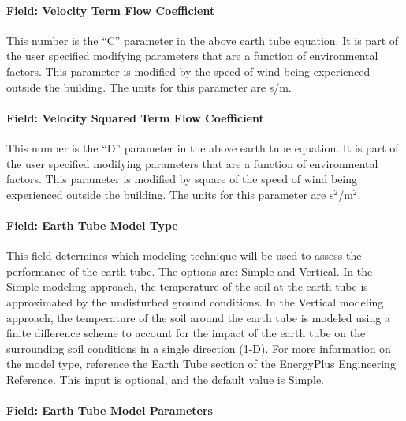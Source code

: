 \paragraph{Field: Velocity Term Flow Coefficient}\label{field-velocity-term-flow-coefficient}

This number is the ``C'' parameter in the above earth tube equation. It is part of the user specified modifying parameters that are a function of environmental factors. This parameter is modified by the speed of wind being experienced outside the building. The units for this parameter are s/m.

\paragraph{Field: Velocity Squared Term Flow Coefficient}\label{field-velocity-squared-term-flow-coefficient}

This number is the ``D'' parameter in the above earth tube equation. It is part of the user specified modifying parameters that are a function of environmental factors. This parameter is modified by square of the speed of wind being experienced outside the building. The units for this parameter are s\(^{2}\)/m\(^{2}\).

\paragraph{Field: Earth Tube Model Type}\label{field-earth-tube-model-type}

This field determines which modeling technique will be used to assess the performance of the earth tube.  The options are: Simple and Vertical.  In the Simple modeling approach, the temperature of the soil at the earth tube is approximated by the undisturbed ground conditions.  In the Vertical modeling approach, the temperature of the soil around the earth tube is modeled using a finite difference scheme to account for the impact of the earth tube on the surrounding soil conditions in a single direction (1-D).  For more information on the model type, reference the Earth Tube section of the EnergyPlus Engineering Reference.  This input is optional, and the default value is Simple.

\paragraph{Field: Earth Tube Model Parameters}\label{field-earth-tube-model-parameters}

